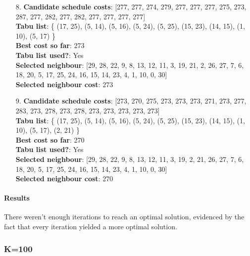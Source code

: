 \documentclass[fleqn]{article}
\begin{document}
\begin{itemize}
    \item[8.] \textbf{Candidate schedule costs}: [277, 277, 274, 279, 277, 277, 277, 275, 273, 287, 277, 282, 277, 282, 277, 277, 277, 277] \\
    \textbf{Tabu list}: \{ (17, 25), (5, 14), (5, 16), (5, 24), (5, 25), (15, 23), (14, 15), (1, 10), (5, 17) \} \\
    \textbf{Best cost so far}: 273 \\
    \textbf{Tabu list used?}: Yes \\
    \textbf{Selected neighbour}: [29, 28, 22, 9, 8, 13, 12, 11, 3, 19, 21, 2, 26, 27, 7, 6, 18, 20, 5, 17, 25, 24, 16, 15, 14, 23, 4, 1, 10, 0, 30] \\
    \textbf{Selected neighbour cost}: 273
      

    \item[9.] \textbf{Candidate schedule costs}: [273, 270, 275, 273, 273, 273, 271, 273, 277, 283, 273, 278, 273, 278, 273, 273, 273, 273, 273] \\
    \textbf{Tabu list}: \{ (17, 25), (5, 14), (5, 16), (5, 24), (5, 25), (15, 23), (14, 15), (1, 10), (5, 17), (2, 21) \} \\
    \textbf{Best cost so far}: 270 \\
    \textbf{Tabu list used?}: Yes \\
    \textbf{Selected neighbour}: [29, 28, 22, 9, 8, 13, 12, 11, 3, 19, 2, 21, 26, 27, 7, 6, 18, 20, 5, 17, 25, 24, 16, 15, 14, 23, 4, 1, 10, 0, 30] \\
    \textbf{Selected neighbour cost}: 270
      
  \end{itemize}

  \paragraph{Results}
  There weren't enough iterations to reach an optimal solution, evidenced by the fact that every iteration yielded a more optimal solution.

  \subsubsection{K=100}
\end{document}

